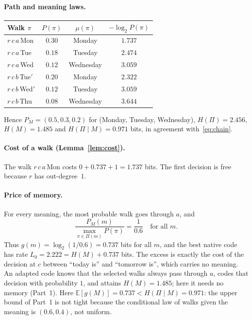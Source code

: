 \documentclass[11pt]{article}
\theoremstyle{remark}
\newcommand{\Pset}{\Pi}
\newcommand{\E}{\mathbb{E}}
\begin{document}
\noindent\begin{minipage}{\linewidth}
\paragraph{Path and meaning laws.}
\begin{center}
\begin{tabular}{lccc}
\toprule
Walk $\pi$ & $P(\pi)$ & $\mu(\pi)$ & $-\log_2 P(\pi)$ \\
\midrule
$r\,c\,a\,$Mon & $0.30$ & Monday & $1.737$\\
$r\,c\,a\,$Tue & $0.18$ & Tuesday & $2.474$\\
$r\,c\,a\,$Wed & $0.12$ & Wednesday & $3.059$\\
$r\,c\,b\,$Tue$'$ & $0.20$ & Monday & $2.322$\\
$r\,c\,b\,$Wed$'$ & $0.12$ & Tuesday & $3.059$\\
$r\,c\,b\,$Thu & $0.08$ & Wednesday & $3.644$\\
\bottomrule
\end{tabular}
\end{center}
\end{minipage}

Hence $P_M=(0.5,0.3,0.2)$ for (Monday, Tuesday, Wednesday), $H(\Pi)=2.456$, $H(M)=1.485$ and $H(\Pi\mid M)=0.971$ bits, in agreement with~\eqref{eq:chain}.

\paragraph{Cost of a walk (Lemma~\ref{lem:cost}).} The walk $r\,c\,a\,$Mon costs $0+0.737+1=1.737$ bits. The first decision is free because $r$ has out-degree~$1$.

\paragraph{Price of memory.} For every meaning, the most probable walk goes through $a$, and
\[
\frac{P_M(m)}{\max_{\pi\in\Pset(m)}P(\pi)}=\frac{1}{0.6}\quad\text{for all } m.
\]
Thus $g(m)=\log_2(1/0.6)=0.737$ bits for all $m$, and the best native code has rate $L_0=2.222=H(M)+0.737$ bits. The excess is exactly the cost of the decision at $c$ between ``today is'' and ``tomorrow is'', which carries no meaning. An adapted code knows that the selected walks always pass through $a$, codes that decision with probability $1$, and attains $H(M)=1.485$; here it needs no memory (Part~1). Here $\E[g(M)]=0.737<H(\Pi\mid M)=0.971$: the upper bound of Part~1 is not tight because the conditional law of walks given the meaning is $(0.6,0.4)$, not uniform.
\end{document}
